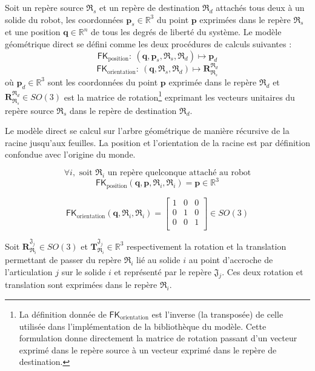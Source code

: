 \begin{definition}
    Soit un repère source $\mathfrak{R}_s$ et un repère de destination $\mathfrak{R}_d$ 
    attachés tous deux à un solide du robot,
    les coordonnées $\bm{p}_s \in \mathbb{R}^3$ du point $\bm{p}$ exprimées dans le repère $\mathfrak{R}_s$ et
    une position $\bm{q} \in \mathbb{R}^n$ de tous les degrés de liberté du système.
    Le modèle géométrique direct se défini comme les deux procédures de calculs suivantes :
    $$\mathsf{FK}_{\text{position}} :~ (\bm{q}, \bm{p}_s, \mathfrak{R}_s, \mathfrak{R}_d) \longmapsto \bm{p}_d$$
    $$\mathsf{FK}_{\text{orientation}} :~ (\bm{q}, \mathfrak{R}_s, \mathfrak{R}_d) 
    \longmapsto \bm{R}_{\mathfrak{R}_s}^{\mathfrak{R}_d}$$
    où $\bm{p}_d \in \mathbb{R}^3$ sont les coordonnées du point $\bm{p}$ exprimée dans le repère $\mathfrak{R}_d$ et 
    $\bm{R}_{\mathfrak{R}_s}^{\mathfrak{R}_d} \in SO(3)$ est la matrice de rotation\footnote{
    La définition donnée de $\mathsf{FK}_{\text{orientation}}$ est 
    l'inverse (la transposée) de celle utilisée dans l'implémentation 
    de la bibliothèque du modèle.
    Cette formulation donne directement la matrice de rotation passant 
    d'un vecteur exprimé dans le repère source
    à un vecteur exprimé dans le repère de destination.} 
    exprimant les vecteurs unitaires du repère
    source $\mathfrak{R}_s$ dans le repère 
    de destination $\mathfrak{R}_d$.
\end{definition}

Le modèle direct se calcul sur l'arbre géométrique de manière 
récursive de la racine jusqu'aux feuilles.
La position et l'orientation de la racine est par définition 
confondue avec l'origine du monde.

$$
\forall i, \text{ soit } \mathfrak{R}_i \text{ un repère quelconque attaché au robot}
$$
$$
\mathsf{FK}_{\text{position}}(\bm{q}, \bm{p}, \mathfrak{R}_i, \mathfrak{R}_i) 
= \bm{p} \in \mathbb{R}^3
$$

$$
\mathsf{FK}_{\text{orientation}}(\bm{q}, \mathfrak{R}_i, \mathfrak{R}_i) 
= 
\begin{bmatrix} 
    1 & 0 & 0 \\ 
    0 & 1 & 0 \\ 
    0 & 0 & 1 \\ 
\end{bmatrix}
\in SO(3)
$$

Soit $\bm{R}_{\mathfrak{R}_{i}}^{\mathfrak{J}_{j}} \in SO(3)$ et
$\bm{T}_{\mathfrak{R}_{i}}^{\mathfrak{J}_{j}} \in \mathbb{R}^3$ respectivement
la rotation et la translation permettant de passer du repère $\mathfrak{R}_{i}$ lié au solide $i$
au point d'accroche de l'articulation $j$ sur le solide $i$ et représenté par le repère $\mathfrak{J}_{j}$.
Ces deux rotation et translation sont exprimées dans le repère $\mathfrak{R}_{i}$.

